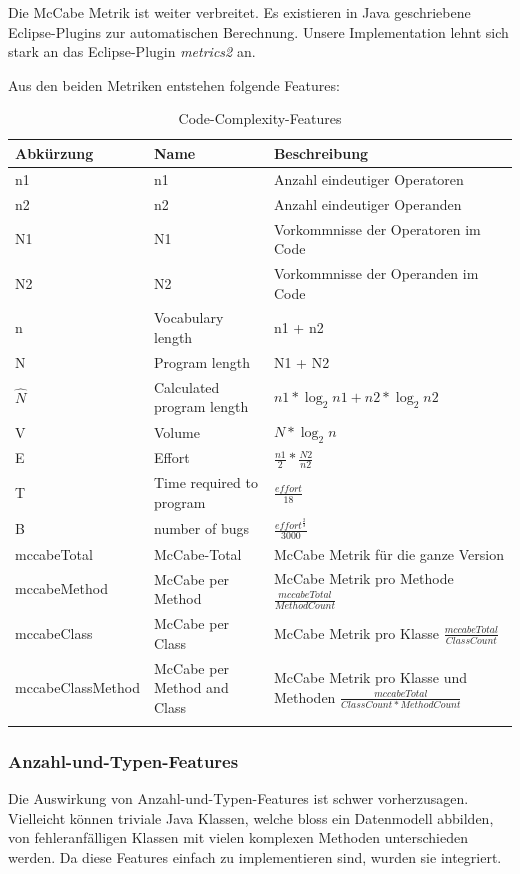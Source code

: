 \documentclass[10pt, a4paper]{article}
\begin{document}
Die McCabe Metrik ist weiter verbreitet. Es existieren in Java geschriebene Eclipse-Plugins zur automatischen Berechnung. Unsere Implementation lehnt sich stark an das Eclipse-Plugin \emph{metrics2} \cite{metrics2} an.

Aus den beiden Metriken entstehen folgende Features:

\begin{longtable}{l|p{3cm}|p{5.75cm}}
		\textbf{Abkürzung} & \textbf{Name} & \textbf{Beschreibung}\\
		\hline
		n1 & n1 & Anzahl eindeutiger Operatoren\\
		n2 & n2 & Anzahl eindeutiger Operanden\\
		N1 & N1 & Vorkommnisse der Operatoren im Code\\
		N2 & N2 & Vorkommnisse der Operanden im Code\\
		n & Vocabulary length & n1 + n2 \\
		N & Program length & N1 + N2\newline\\
		\(\hat{N}\) & Calculated program length & \(n1*\log_2{n1} + n2*\log_2{n2}\)\\
		V & Volume\newline & \(N*\log_2{n}\)\\
		E & Effort\newline & \(\frac{n1}{2} * \frac{N2}{n2}\)\\
		T & Time required to program & \(\frac{effort}{18}\)\\
		B & number of bugs & \(\frac{effort^\frac{2}{3}}{3000}\)\\
		mccabeTotal & McCabe-Total\newline & McCabe Metrik für die ganze Version\\
		mccabeMethod & McCabe per Method\newline & McCabe Metrik pro Methode \(\frac{mccabeTotal}{MethodCount}\)\\
		mccabeClass & McCabe per Class & McCabe Metrik pro Klasse \(\frac{mccabeTotal}{ClassCount}\) \newline\\
		mccabeClassMethod & McCabe per Method and Class & McCabe Metrik pro Klasse und Methoden  \(\frac{mccabeTotal}{ClassCount*MethodCount}\)\\
	\caption{Code-Complexity-Features}
	\label{tab:codecomplexityfeatures}
\end{longtable}

\subsubsection{Anzahl-und-Typen-Features}
Die Auswirkung von Anzahl-und-Typen-Features ist schwer vorherzusagen. Vielleicht können triviale Java Klassen, welche bloss ein Datenmodell abbilden, von fehleranfälligen Klassen mit vielen komplexen Methoden unterschieden werden. Da diese Features einfach zu implementieren sind, wurden sie integriert.
\end{document}
